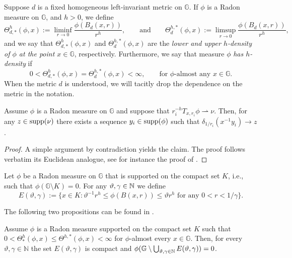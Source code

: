 \documentclass[10pt, a4paper,
oneside, headinclude,footinclude]{scrartcl}
\begin{document}
\begin{definizione}\label{def:densities}
Suppose $d$ is a fixed homogeneous left-invariant metric on $\mathbb{G}$. If $\phi$ is a Radon measure on $\mathbb{G}$, and $h>0$, we define
$$
\Theta_{d,*}^{h}(\phi,x):=\liminf_{r\to 0} \frac{\phi(B_{d}(x,r))}{r^{h}},\qquad \text{and}\qquad \Theta^{h,*}_{d}(\phi,x):=\limsup_{r\to 0} \frac{\phi(B_d(x,r))}{r^{h}},
$$
and we say that $\Theta_{d,*}^{h}(\phi,x)$ and $\Theta^{h,*}_{d}(\phi,x)$ are the {\em lower and upper $h$-density of $\phi$ at the point $x\in\mathbb{G}$}, respectively. Furthermore, we say that measure $\phi$ {\em has $h$-density} if
$$
0<\Theta_{d,*}^{h}(\phi,x)=\Theta^{h,*}_{d}(\phi,x)<\infty,\qquad \text{for }\phi\text{-almost any }x\in\mathbb{G}.
$$
When the metric $d$ is understood, we will tacitly drop the dependence on the metric in the notation.
\end{definizione}

\begin{proposizione}\label{prop:convergence}
Assume $\phi$ is a Radon measure on $\mathbb{G}$ and suppose that $r_i^{-h}T_{x,r_i}\phi\rightharpoonup \nu$. Then, for any $z\in\operatorname*{supp}(\nu)$ there exists a sequence $y_i\in \operatorname*{supp}(\phi)$ such that $\delta_{1/r_i}(x^{-1}y_i)\to z$.
\end{proposizione}

\begin{proof}
A simple argument by contradiction yields the claim. The proof follows verbatim its Euclidean analogue, see for instance the proof of \cite[Proposition 3.4]{DeLellis2008RectifiableMeasures}.
\end{proof}


\begin{definizione}\label{def:EThetaGamma}
Let $\phi$ be a Radon measure on $\mathbb G$ that is supported on the compact set $K$, i.e., such that $\phi(\mathbb G\setminus K)=0$. For any $\vartheta,\gamma\in\mathbb{N}$ we define
\begin{equation}
    E(\vartheta,\gamma):=\big\{x\in K:\vartheta^{-1}r^h\leq \phi(B(x,r))\leq \vartheta r^h\text{ for any }0<r<1/\gamma\big\}.
    \label{eq:A1}
\end{equation}
\end{definizione}

The following two propositions can be found in \cite[Proposition 2.4 and Proposition 2.5]{antonelli2020rectifiable}.

\begin{proposizione} \label{prop::E}
Assume $\phi$ is a Radon measure supported on the compact set $K$ such that $
0<\Theta^h_*(\phi,x)\leq \Theta^{h,*}(\phi,x)<\infty
$ for $\phi$-almost every $x\in\mathbb G$. Then, for every $\vartheta,\gamma\in\mathbb N$ the set $E(\vartheta,\gamma)$ is compact and $\phi(\mathbb{G}\setminus \bigcup_{\vartheta,\gamma\in\mathbb{N}} E(\vartheta,\gamma))=0$.
\end{proposizione}
\end{document}
